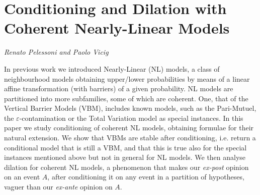 \documentclass[../booklet.tex]{subfiles}
\begin{document}
\section[Conditioning and Dilation with Coherent Nearly-Linear Models. {\it Renato Pelessoni and Paolo Vicig}]{Conditioning and Dilation with Coherent Nearly-Linear Models}
 

\begin{center}
  {\it Renato Pelessoni and Paolo Vicig}
\end{center}

\vskip 0.8cm


In previous work \cite{corsato_nearly-linear_2019} we introduced Nearly-Linear (NL) models, a class of neighbourhood models obtaining upper/lower probabilities by means of a linear affine transformation (with barriers) of a given probability.
NL models are partitioned into more subfamilies, some of which are coherent.
One, that of the Vertical Barrier Models (VBM), includes known models, such as the Pari-Mutuel, the $\varepsilon$-contamination or the Total Variation model as special instances.
In this paper we study conditioning of coherent NL models, obtaining formulae for their natural extension.
We show that VBMs are stable after conditioning, i.e. return a conditional model that is still a VBM, and that this is true also for the special instances mentioned above but not in general for NL models. We then analyse dilation for coherent NL models, a phenomenon that makes our \emph{ex-post} opinion on an event $A$, after conditioning it on any event in a partition of hypotheses, vaguer than our \emph{ex-ante} opinion on $A$.

\end{document}
